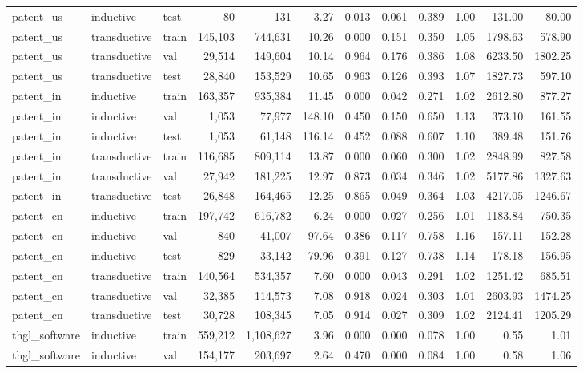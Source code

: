 \begin{table}[t]
{\begin{tabular}{lllrrrrrrrrr}
patent\_us & inductive & test & 80 & 131 & 3.27 & 0.013 & 0.061 & 0.389 & 1.00 & 131.00 & 80.00 \\
patent\_us & transductive & train & 145,103 & 744,631 & 10.26 & 0.000 & 0.151 & 0.350 & 1.05 & 1798.63 & 578.90 \\
patent\_us & transductive & val & 29,514 & 149,604 & 10.14 & 0.964 & 0.176 & 0.386 & 1.08 & 6233.50 & 1802.25 \\
patent\_us & transductive & test & 28,840 & 153,529 & 10.65 & 0.963 & 0.126 & 0.393 & 1.07 & 1827.73 & 597.10 \\
patent\_in & inductive & train & 163,357 & 935,384 & 11.45 & 0.000 & 0.042 & 0.271 & 1.02 & 2612.80 & 877.27 \\
patent\_in & inductive & val & 1,053 & 77,977 & 148.10 & 0.450 & 0.150 & 0.650 & 1.13 & 373.10 & 161.55 \\
patent\_in & inductive & test & 1,053 & 61,148 & 116.14 & 0.452 & 0.088 & 0.607 & 1.10 & 389.48 & 151.76 \\
patent\_in & transductive & train & 116,685 & 809,114 & 13.87 & 0.000 & 0.060 & 0.300 & 1.02 & 2848.99 & 827.58 \\
patent\_in & transductive & val & 27,942 & 181,225 & 12.97 & 0.873 & 0.034 & 0.346 & 1.02 & 5177.86 & 1327.63 \\
patent\_in & transductive & test & 26,848 & 164,465 & 12.25 & 0.865 & 0.049 & 0.364 & 1.03 & 4217.05 & 1246.67 \\
patent\_cn & inductive & train & 197,742 & 616,782 & 6.24 & 0.000 & 0.027 & 0.256 & 1.01 & 1183.84 & 750.35 \\
patent\_cn & inductive & val & 840 & 41,007 & 97.64 & 0.386 & 0.117 & 0.758 & 1.16 & 157.11 & 152.28 \\
patent\_cn & inductive & test & 829 & 33,142 & 79.96 & 0.391 & 0.127 & 0.738 & 1.14 & 178.18 & 156.95 \\
patent\_cn & transductive & train & 140,564 & 534,357 & 7.60 & 0.000 & 0.043 & 0.291 & 1.02 & 1251.42 & 685.51 \\
patent\_cn & transductive & val & 32,385 & 114,573 & 7.08 & 0.918 & 0.024 & 0.303 & 1.01 & 2603.93 & 1474.25 \\
patent\_cn & transductive & test & 30,728 & 108,345 & 7.05 & 0.914 & 0.027 & 0.309 & 1.02 & 2124.41 & 1205.29 \\
thgl\_software & inductive & train & 559,212 & 1,108,627 & 3.96 & 0.000 & 0.000 & 0.078 & 1.00 & 0.55 & 1.01 \\
thgl\_software & inductive & val & 154,177 & 203,697 & 2.64 & 0.470 & 0.000 & 0.084 & 1.00 & 0.58 & 1.06 \\

\end{tabular}}
\end{table}
